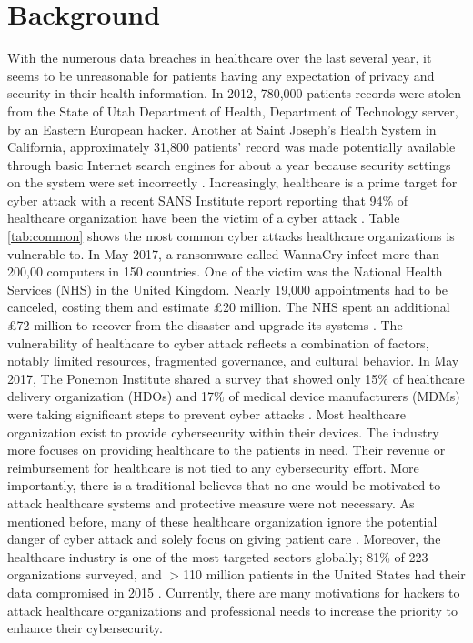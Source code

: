 \documentclass{IEEEtran}
\begin{document}
\section{Background}
With the numerous data breaches in healthcare over the last several year, it seems to be unreasonable for patients having any expectation of privacy and security in their health information. In 2012, 780,000 patients records were stolen from the State of Utah Department of Health, Department of Technology server, by an Eastern European hacker. Another at Saint Joseph's Health System in California, approximately 31,800 patients' record was made potentially available through basic Internet search engines for about a year because security settings on the system were set incorrectly \cite{murphy2015cybersecurity}. Increasingly, healthcare is a prime target for cyber attack with a recent SANS Institute report reporting that 94\% of healthcare organization have been the victim of a cyber attack \cite{williams2015cybersecurity}. Table \ref{tab:common} shows the most common cyber attacks healthcare organizations is vulnerable to. In May 2017, a ransomware called WannaCry infect more than 200,00 computers in 150 countries. One of the victim was the National Health Services (NHS) in the United Kingdom. Nearly 19,000 appointments had to be canceled, costing them and estimate \pounds20 million. The NHS spent an additional \pounds72 million to recover from the disaster and upgrade its systems \cite{ferrara2019cybersecurity}. The vulnerability of healthcare to cyber attack reflects a combination of factors, notably limited resources, fragmented governance, and cultural behavior. In May 2017, The Ponemon Institute shared a survey that showed only 15\% of healthcare delivery organization (HDOs) and 17\% of medical device manufacturers (MDMs) were taking significant steps to prevent cyber attacks \cite{busdicker2017role}. Most healthcare organization exist to provide cybersecurity within their devices. The industry more focuses on providing healthcare to the patients in need. Their revenue or reimbursement for healthcare is not tied to any cybersecurity effort. More importantly, there is a traditional believes that no one would be motivated to attack healthcare systems and protective measure were not necessary. As mentioned before, many of these healthcare organization ignore the potential danger of cyber attack and solely focus on giving patient care \cite{coventry2018cybersecurity}. Moreover, the healthcare industry is one of the most targeted sectors globally; 81\% of 223 organizations surveyed, and $>$110 million patients in the United States had their data compromised in 2015 \cite{martin2017cybersecurity}. Currently, there are many motivations for hackers to attack healthcare organizations and professional needs to increase the priority to enhance their cybersecurity. 
 
\end{document}
